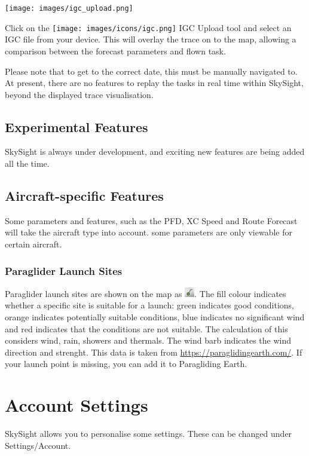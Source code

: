 \documentclass[11pt,a4paper]{article}
\begin{document}
\begin{center}
\texttt{[image: images/igc\_upload.png]}
\end{center}

Click on the \texttt{[image: images/icons/igc.png]} IGC Upload tool and select an IGC file from your device. This will overlay the trace on to the map, allowing a comparison between the forecast parameters and flown task.

Please note that to get to the correct date, this must be manually navigated to. At present, there are no features to replay the tasks in real time within SkySight, beyond the displayed trace visualisation.

\subsection{Experimental Features}
SkySight is always under development, and exciting new features are being added all the time.

\subsection{Aircraft-specific Features}\label{subsec:specific_features}

Some parameters and features, such as the PFD, XC Speed and Route Forecast will take the aircraft type into account. some parameters are only viewable for certain aircraft.

\subsubsection{Paraglider Launch Sites}


Paraglider launch sites are shown on the map as \includegraphics[height=12pt]{images/icons/paraglider_launch.png}. The fill colour indicates whether a specific site is suitable for a launch: green indicates good conditions, orange indicates potentially suitable conditions, blue indicates no significant wind and red indicates that the conditions are not suitable. The calculation of this considers wind, rain, showers and thermals. The wind barb indicates the wind direction and strenght. This data is taken from \url{https://paraglidingearth.com/}. If your launch point is missing, you can add it to Paragliding Earth.


\section{Account Settings}
SkySight allows you to personalise some settings. These can be changed under Settings/Account.
\end{document}
